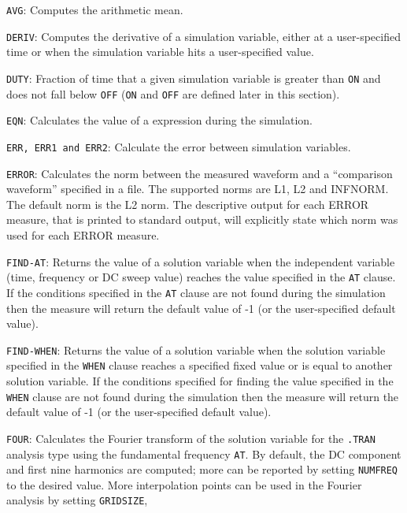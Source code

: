 \begin{XyceItemize}
\item \texttt{AVG}: Computes the arithmetic mean.
\item \texttt{DERIV}: Computes the derivative of a simulation variable, either at a user-specified
    time or when the simulation variable hits a user-specified value.
\item \texttt{DUTY}: Fraction of time that a given simulation variable is greater than \texttt{ON} and 
    does not fall below \texttt{OFF} (\texttt{ON} and \texttt{OFF} are defined later in this section).
 \item \texttt{EQN}: Calculates the value of a \Xyce{} expression during the simulation.
 \item \texttt{ERR, ERR1 and ERR2}: Calculate the error between simulation variables.
 \item \texttt{ERROR}: Calculates the norm between the measured waveform and a ``comparison
    waveform'' specified in a file.  The supported norms are L1, L2 and INFNORM.  The
    default norm is the L2 norm.  The descriptive output for each ERROR measure,
    that is printed to standard output, will explicitly state which norm  was used for 
    each ERROR measure.
 \item \texttt{FIND-AT}: Returns the value of a solution variable when the independent variable
    (time, frequency or DC sweep value) reaches the value specified in the \texttt{AT} clause.
    If the conditions specified in the \texttt{AT} clause are not found during the simulation
    then the measure will return the default value of -1 (or the user-specified default value).
 \item \texttt{FIND-WHEN}: Returns the value of a solution variable when the solution variable specified 
    in the \texttt{WHEN} clause reaches a specified fixed value or is equal to another solution variable.  
    If the conditions specified for finding the value specified in the \texttt{WHEN} clause are not found 
    during the simulation then the measure will return the default value of -1 (or the user-specified 
    default value).
  \item \texttt{FOUR}: Calculates the Fourier transform of the solution variable for the \texttt{.TRAN}
    analysis type using the fundamental frequency \texttt{AT}.  By default, the DC component 
    and first nine harmonics are computed; more can be reported by setting \texttt{NUMFREQ} to the
    desired value.  More interpolation points can be used in the Fourier analysis by setting \texttt{GRIDSIZE},

\end{XyceItemize}
